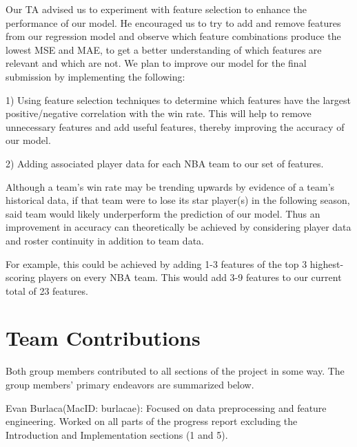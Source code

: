 \documentclass[11pt]{article}
\begin{document}

Our TA advised us to experiment with feature selection to enhance the performance of our model. He encouraged us to try to add and remove features from our regression model and observe which feature combinations produce the lowest MSE and MAE, to get a better understanding of which features are relevant and which are not.
We plan to improve our model for the final submission by implementing the following:
\medskip

1) Using feature selection techniques to determine which features have the largest positive/negative correlation with the win rate. This will help to remove unnecessary features and add useful features, thereby improving the accuracy of our model.
\medskip

2) Adding associated player data for each NBA team to our set of features.

Although a team's win rate may be trending upwards by evidence of a team's historical data, if that team were to lose its star player(s) in the following season, said team would likely underperform the prediction of our model. Thus an improvement in accuracy can theoretically be achieved by considering player data and roster continuity in addition to team data.

For example, this could be achieved by adding 1-3 features of the top 3 highest-scoring players on every NBA team. This would add 3-9 features to our current total of 23 features.



\section*{Team Contributions}
Both group members contributed to all sections of the project in some way. The group members' primary endeavors are summarized below.
\medskip

Evan Burlaca(MacID: burlacae): Focused on data preprocessing and feature engineering. Worked on all parts of the progress report excluding the Introduction and Implementation sections (1 and 5).
\medskip
\end{document}
